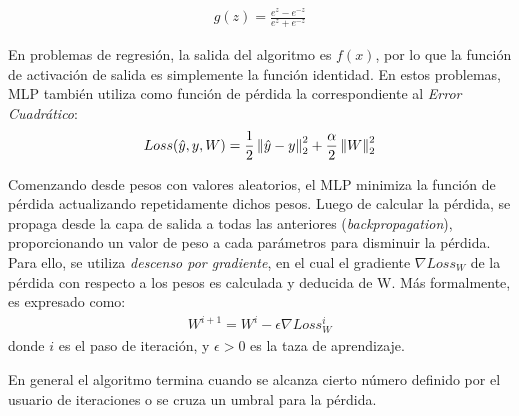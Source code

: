       \begin{align}
        g(z) = \frac{e^{z} - e^{-z}}{e^{z} + e^{-z}}
      \end{align}

      En problemas de regresión, la salida del algoritmo es $f(x)$, por lo que la
      función de activación de salida es simplemente la función identidad. En estos
      problemas, MLP también utiliza como función de pérdida la correspondiente
      al \textit{Error Cuadrático}:
      \begin{align}
        Loss(\hat{y}, y, W) = \frac{1}{2} \left\lVert\hat{y} - y\right\rVert^{2}_{2} + \frac{\alpha}{2} \left\lVert W\right\rVert^{2}_{2}
      \end{align}



    \par Comenzando desde pesos con valores aleatorios, el MLP minimiza la función de
      pérdida actualizando repetidamente dichos pesos. Luego de calcular la pérdida,
      se propaga desde la capa de salida a todas las anteriores (\textit{backpropagation}),
      proporcionando un valor de peso a cada parámetros para disminuir la pérdida.
      Para ello, se utiliza \textit{descenso por gradiente}, en el cual el
      gradiente $\nabla Loss_{W}$ de la pérdida con respecto a los pesos es
      calculada y deducida de W.
      Más formalmente, es expresado como:
      \begin{align}
        W^{i + 1} = W^{i} - \epsilon \nabla Loss^{i}_{W}
      \end{align}
      donde $i$ es el paso de iteración, y $\epsilon > 0$ es la taza de aprendizaje.

      En general el algoritmo termina cuando se alcanza cierto número definido por el
      usuario de iteraciones o se cruza un umbral para la pérdida.


%
